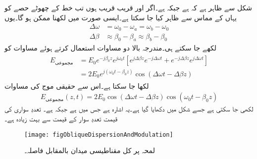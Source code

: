 شکل   سے ظاہر ہے کہ  ہے جبکہ 
 ہے۔اگر  اور  قریب قریب ہوں تب  خط کے چھوٹے حصے کو یہاں کے مماس سے ظاہر کیا جا سکتا ہے۔ایسی صورت میں   لکھنا ممکن ہو گا۔یوں
\begin{align}
\Delta \omega&=\omega_0-\omega_a=\omega_b-\omega_0\\
\Delta \beta&\approx\beta_0-\beta_a\approx\beta_b-\beta_0
\end{align}
لکھے جا سکتے ہی۔مندرجہ بالا دو مساوات استعمال کرتے ہوئے مساوات  کو
\begin{gather}
\begin{aligned}
E_{\text{مجموعی}}&=E_0 e^{-j \beta_0 z} e^{j \omega_0 t}\left[e^{j \Delta \beta z} e^{-j \Delta \omega t}+e^{-j \Delta \beta z} e^{j \Delta \omega t}\right]\\
&=2 E_0 e^{j(\omega_0 t -\beta_0 z)} \cos(\Delta \omega t-\Delta \beta z)
\end{aligned}
\end{gather}
 لکھا جا سکتا ہے۔اس سے حقیقی موج کی مساوات
\begin{align}\label{مساوات_ترچھی_انتشار_سوار_اشارہ}
E_{\text{مجموعی}}(z,t)=2 E_0 \cos(\Delta \omega t-\Delta \beta z) \cos (\omega_0 t -\beta_0 z)
\end{align}
لکھی جا سکتی ہے جسے شکل  میں دکھایا گیا ہے۔یہ  اشارہ ہے جس میں   ہے جبکہ   ہے۔ تعددِ سواری کی قیمت تعددِ سوار کے قیمت سے بہت زیادہ ہے۔ 
\begin{figure}
\centering
\texttt{[image: figObliqueDispersionAndModulation]}
\caption{لمحہ  پر کل مقناطیسی میدان بالمقابل فاصلہ۔}
\label{شکل_ترچھی_سوار_اشارہ_انتشار}
\end{figure}

